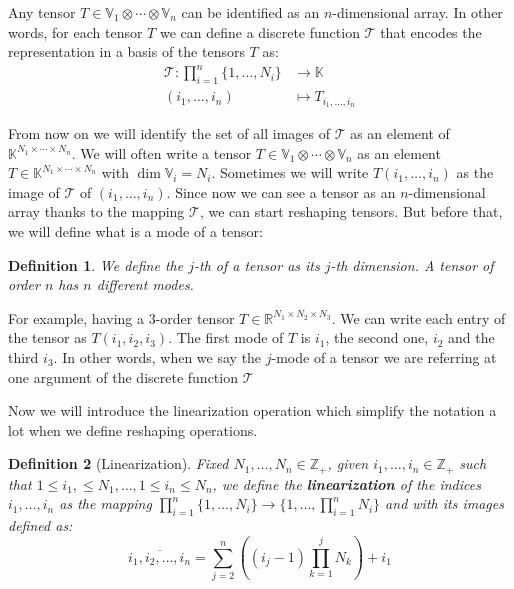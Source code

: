 \documentclass[11pt,a4paper,openright,oneside]{book}
\numberwithin{equation}{section}
\newtheorem{defn0}{Definition}[chapter]
\newenvironment{definition}{ \begin{defn0}}{\end{defn0}}
\begin{document}
Any tensor $T \in \mathbb{V}_1 \otimes \cdots \otimes \mathbb{V}_n$ can be identified as an $n$-dimensional array. In other words, for each
tensor $T$ we can define a discrete function $\mathcal{T}$ that encodes the representation in a basis of the tensors $T$ as:
$$\begin{align}
    \mathcal{T}: \prod_{i=1}^n \{1, \dots, N_i\} & \longrightarrow \mathbb{K} \\
    (i_1, \dots, i_n) & \longmapsto T_{i_1, \dots, i_n}
\end{align}$$

From now on we will identify the set of all images of $\mathcal{T}$ as
an element of ${\mathbb{K}^{N_1 \times \cdots \times N_n}}$.
We will often write a tensor $T \in \mathbb{V}_1 \otimes \cdots \otimes \mathbb{V}_n$ as an element $T \in \mathbb{K}^{N_1 \times \cdots \times N_n}$
with $\dim \mathbb{V}_i = N_i$. Sometimes we will write $T(i_1, \dots, i_n)$ as the image of $\mathcal{T}$ of $(i_1, \dots, i_n)$.
Since now we can see a tensor as an $n$-dimensional array thanks to the mapping $\mathcal{T}$, we can 
start reshaping tensors. But before that, we will define what is a mode of a tensor:

\begin{definition}
We define the $j$-th of a tensor as its $j$-th dimension. A tensor of order $n$ has $n$ different modes.
\end{definition}

For example, having a $3$-order tensor $T \in \mathbb{R}^{N_1 \times N_2 \times N_3}$. We can write each entry of the tensor
as $T(i_1, i_2, i_3)$. The first mode of $T$ is $i_1$, the second one, $i_2$ and the third $i_3$. In other words, when we say
the $j$-mode of a tensor we are referring at one argument of the discrete function $\mathcal{T}$


Now we will introduce the linearization operation which simplify the notation a lot when we define
reshaping operations.

\begin{definition}[Linearization]
    Fixed $N_1, \dots, N_n \in \mathbb{Z}_+$, given $i_1, \dots, i_n \in \mathbb{Z}_+$ such that $1 \leqslant i_1, \leqslant N_1, \dots, 1 \leqslant i_n \leqslant N_n$,
    we define the \textbf{linearization} of the indices $i_1, \dots, i_n$ as the mapping ${\prod_{i=1}^n \{1, \dots, N_i\} \rightarrow \{1, \dots, \prod_{i=1}^n N_i\}}$ and
    with its images defined as:
    $$\overline {i_1, i_2, \dots, i_n} = \sum_{j=2}^{n} \left( (i_j - 1) \prod_{k=1}^j N_k \right) + i_1$$
\end{definition}
\end{document}
